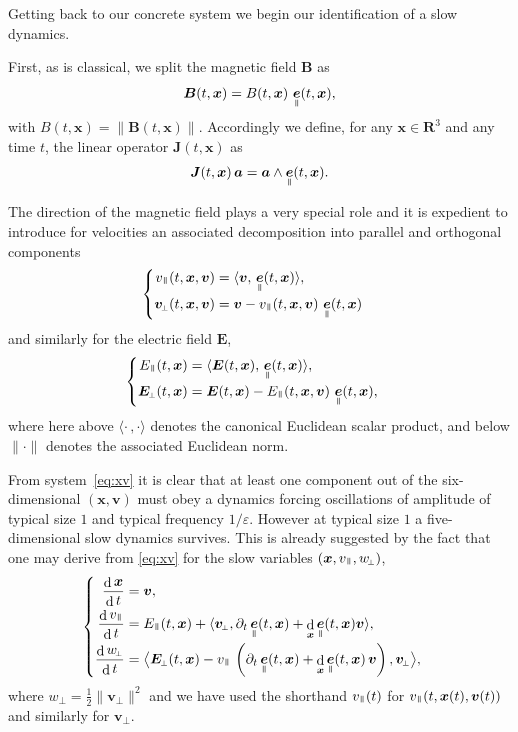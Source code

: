 \documentclass[10pt]{amsart}
\newenvironment{splitcases}
{\begin{cases}\begin{aligned}}
{\end{aligned}\end{cases}}
\newcommand{\sperp}{{\scriptscriptstyle\perp}}
\newcommand{\blangle}{\bigl\langle}
\newcommand{\brangle}{\bigr\rangle}
\let\eps\varepsilon
\let\d\partial
\DeclareMathOperator\dD{d}\let\dd\dD
\theoremstyle{plain}
\theoremstyle{definition}
\newcommand{\be}{\begin{equation}}
\newcommand{\ee}{\end{equation}}
\newcommand\R{\mathbf R}
\newcommand\bB{{\boldsymbol B}}
\newcommand\bE{{\boldsymbol E}}
\newcommand\bJ{{\boldsymbol J}}
\newcommand\bfa{{\boldsymbol a}}
\newcommand\bfv{{\boldsymbol v}}
\newcommand\bfx{{\boldsymbol x}}
\DeclareMathOperator{\beD}{\boldsymbol{e}}
\newcommand\eDpar{\beD_\mypar}
\newcommand\vpar{v_\mypar}
\newcommand\bvperp{\bfv_{\!\sperp}}
\newcommand\eperp{w_{\!\sperp}}
\newcommand\Epar{E_\mypar}
\newcommand\Eperp{\bE_{\!\sperp}}
\newcommand{\mypar}{{\mkern3mu\vphantom{\perp}\vrule depth 0pt\mkern2mu\vrule depth 0pt\mkern3mu}}
\begin{document}
Getting back to our concrete system we begin our identification of a slow dynamics.

First, as is classical, we split the magnetic field $\bB$ as
\[
\bB(t,\bfx)=B(t,\bfx)\,\eDpar(t,\bfx),
\]
with $B(t,\bfx)=\|\bB(t,\bfx)\|$. Accordingly we define, for any $\bfx\in\R^3$ and any time $t$, the linear operator $\bJ(t,\bfx)$ as
\be
\label{def:J}
\bJ(t,\bfx) \,\bfa= \bfa\wedge \eDpar(t,\bfx).
\ee

The direction of the magnetic field plays a very special role and it is expedient to introduce for velocities an associated decomposition into parallel and orthogonal components
\[
\begin{splitcases}
\vpar(t,\bfx,\bfv) &=\langle\bfv,\,\eDpar(t,\bfx)\rangle,
\\
\bvperp(t,\bfx,\bfv)&=\bfv-\vpar(t,\bfx,\bfv)\,\eDpar(t,\bfx)
\end{splitcases}
\]
and similarly for the electric field $\bE$,
\[
\begin{splitcases}
\Epar(t,\bfx)&=\langle\bE(t,\bfx),\,\eDpar(t,\bfx)\rangle,
\\
\Eperp(t,\bfx)&=\bE(t,\bfx)-\Epar(t,\bfx,\bfv)\,\eDpar(t,\bfx),
\end{splitcases}
\]
where here above $\langle\cdot\,,\cdot\rangle$ denotes the canonical Euclidean scalar product, and below $\|\cdot\|$ denotes the associated Euclidean norm.

From system~\eqref{eq:xv} it is clear that at least one component out of the six-dimensional $(\bfx,\bfv)$ must obey a dynamics forcing oscillations of amplitude of typical size $1$ and typical frequency $1/\eps$. However at typical size $1$ a five-dimensional slow dynamics survives. This is already suggested by the fact that one may derive from \eqref{eq:xv} for the slow variables $(\bfx,\vpar,\eperp)$,
\be
\label{eq:1}
\begin{splitcases}

\frac{\dD\bfx}{\dD t} &=\bfv,
\\
\frac{\dD\vpar}{\dD t}&=\Epar(t,\bfx)+\langle \bvperp ,
\d_t\eDpar(t,\bfx)+\dD_{\bfx}\eDpar(t,\bfx)\bfv \rangle,
\\
\frac{\dD\eperp}{\dD t}&= \blangle \Eperp(t,\bfx) -\vpar\,\left(
\d_t\eDpar(t,\bfx)+\dD_{\bfx}\eDpar(t,\bfx)\,\bfv\right), \bvperp\brangle,
\end{splitcases}
\ee
where $\eperp=\tfrac12\|\bvperp\|^2$ and we have used the shorthand $\vpar(t)$ for
$\vpar(t,\bfx(t),\bfv(t))$ and similarly for $\bvperp$.
\end{document}
